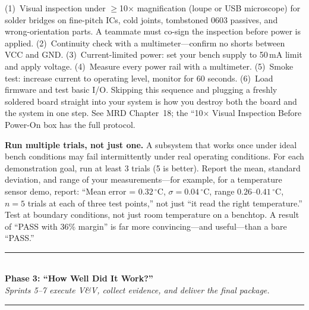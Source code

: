 \documentclass[11pt,letterpaper]{article}
\begin{document}
\begin{tipbox} (1)~Visual inspection under $\geq$10$\times$ magnification (loupe or USB microscope) for solder bridges on fine-pitch ICs, cold joints, tombstoned 0603 passives, and wrong-orientation parts. A teammate must co-sign the inspection before power is applied. (2)~Continuity check with a multimeter---confirm no shorts between VCC and GND. (3)~Current-limited power: set your bench supply to 50\,mA limit and apply voltage. (4)~Measure every power rail with a multimeter. (5)~Smoke test: increase current to operating level, monitor for 60 seconds. (6)~Load firmware and test basic I/O. Skipping this sequence and plugging a freshly soldered board straight into your system is how you destroy both the board and the system in one step. See MRD Chapter~18; the ``10$\times$ Visual Inspection Before Power-On box has the full protocol.
\end{tipbox}

\begin{tipbox}
\textbf{Run multiple trials, not just one.} A subsystem that works once under ideal bench conditions may fail intermittently under real operating conditions. For each demonstration goal, run at least 3 trials (5 is better). Report the mean, standard deviation, and range of your measurements---for example, for a temperature sensor demo, report: ``Mean error = $0.32\,^{\circ}\text{C}$, $\sigma = 0.04\,^{\circ}\text{C}$, range $0.26$--$0.41\,^{\circ}\text{C}$, $n = 5$ trials at each of three test points,'' not just ``it read the right temperature.'' Test at boundary conditions, not just room temperature on a benchtop. A result of ``PASS with 36\% margin'' is far more convincing---and useful---than a bare ``PASS.''
\end{tipbox}

\vspace{0.5em}
\begin{center}
\textcolor{minesblue}{\rule{0.6\textwidth}{1pt}}\\[4pt]
{\Large\bfseries\sffamily\color{minesblue} Phase 3: ``How Well Did It Work?''}\\[2pt]
{\small\itshape Sprints 5--7 execute V\&V, collect evidence, and deliver the final package.}\\[4pt]
\textcolor{minesblue}{\rule{0.6\textwidth}{1pt}}
\end{center}
\vspace{0.5em}
\end{document}
